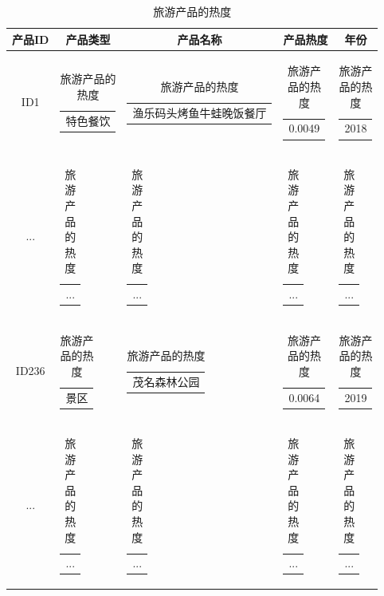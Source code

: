 \documentclass[bwprint]{gmcmthesis}
\begin{document}
\begin{center}
  \begin{longtable}{c|c|c|c|c}
    \caption{旅游产品的热度}
    \label{hot_rate}\\
      \hline
      \textbf{产品ID} & \textbf{产品类型} & \textbf{产品名称} & \textbf{产品热度}& \textbf{年份}\\
      \hline
      ID1 & \begin{tabular}[c]{@{}c@{}}
        特色餐饮
        \end{tabular} 
        & \begin{tabular}[c]{@{}l@{}}
          渔乐码头烤鱼牛蛙晚饭餐厅
        \end{tabular} 
        & \begin{tabular}[c]{@{}c@{}}
          0.0049
          \end{tabular}
          & \begin{tabular}[c]{@{}c@{}}
            2018
            \end{tabular}\\
        ... & \begin{tabular}[c]{@{}c@{}}
          ...
        \end{tabular} 
        & \begin{tabular}[c]{@{}l@{}}
          ...
        \end{tabular} 
        & \begin{tabular}[c]{@{}c@{}}
          ...
        \end{tabular} 
        & \begin{tabular}[c]{@{}c@{}}
          ...
        \end{tabular} \\

        ID236 & \begin{tabular}[c]{@{}c@{}}
          景区
          \end{tabular} 
          & \begin{tabular}[c]{@{}l@{}}
            茂名森林公园
          \end{tabular} 
          & \begin{tabular}[c]{@{}c@{}}
            0.0064
            \end{tabular}
            & \begin{tabular}[c]{@{}c@{}}
              2019
              \end{tabular}\\
          ... & \begin{tabular}[c]{@{}c@{}}
            ...
          \end{tabular} 
          & \begin{tabular}[c]{@{}l@{}}
            ...
          \end{tabular} 
          & \begin{tabular}[c]{@{}c@{}}
            ...
          \end{tabular} 
          & \begin{tabular}[c]{@{}c@{}}
            ...
          \end{tabular} \\


\end{longtable}
\end{center}
\end{document}
